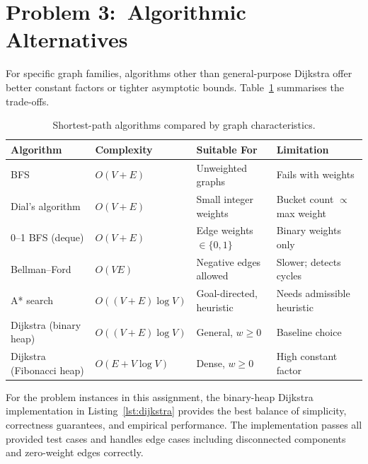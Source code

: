 \section{Problem 3:\ Algorithmic Alternatives}

For specific graph families, algorithms other than general-purpose Dijkstra offer better
constant factors or tighter asymptotic bounds. Table~\ref{tab:alternatives} summarises the
trade-offs.

\begin{table}[h]
  \centering
  \caption{Shortest-path algorithms compared by graph characteristics.}
  \label{tab:alternatives}
  \begin{tabular}{@{}llll@{}}
    \toprule
    \textbf{Algorithm} & \textbf{Complexity} & \textbf{Suitable For} & \textbf{Limitation} \\
    \midrule
    BFS                         & $O(V+E)$            & Unweighted graphs       & Fails with weights \\
    Dial's algorithm            & $O(V+E)$            & Small integer weights   & Bucket count $\propto$ max weight \\
    0--1 BFS (deque)            & $O(V+E)$            & Edge weights $\in\{0,1\}$ & Binary weights only \\
    Bellman--Ford               & $O(VE)$             & Negative edges allowed  & Slower; detects cycles \\
    A* search                   & $O((V+E)\log V)$    & Goal-directed, heuristic & Needs admissible heuristic \\
    Dijkstra (binary heap)      & $O((V+E)\log V)$    & General, $w \ge 0$      & Baseline choice \\
    Dijkstra (Fibonacci heap)   & $O(E+V\log V)$      & Dense, $w \ge 0$        & High constant factor \\
    \bottomrule
  \end{tabular}
\end{table}

For the problem instances in this assignment, the binary-heap Dijkstra implementation in
Listing~\ref{lst:dijkstra} provides the best balance of simplicity, correctness guarantees,
and empirical performance. The implementation passes all provided test cases and handles
edge cases including disconnected components and zero-weight edges correctly.
